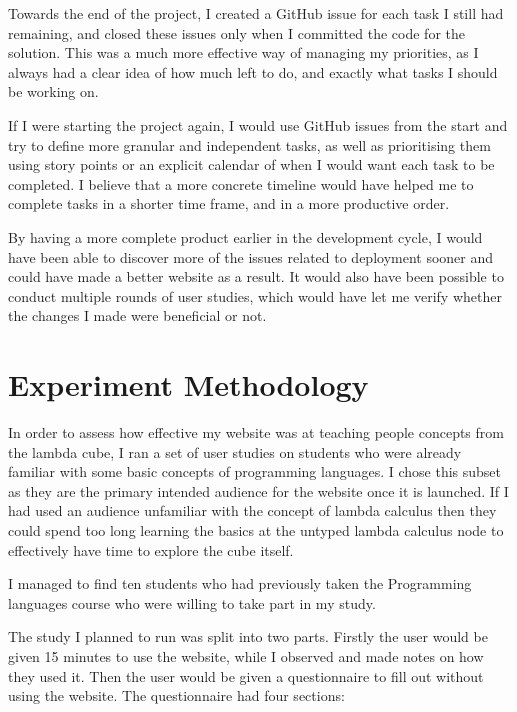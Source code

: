 \documentclass{l4proj}
\begin{document}
Towards the end of the project, I created a GitHub issue for each task I still had remaining, and closed these issues only when I committed the code for the solution.  This was a much more effective way of managing my priorities, as I always had a clear idea of how much left to do, and exactly what tasks I should be working on.

If I were starting the project again, I would use GitHub issues from the start and try to define more granular and independent tasks, as well as prioritising them using story points or an explicit calendar of when I would want each task to be completed.  I believe that a more concrete timeline would have helped me to complete tasks in a shorter time frame, and in a more productive order.

By having a more complete product earlier in the development cycle, I would have been able to discover more of the issues related to deployment sooner and could have made a better website as a result.  It would also have been possible to conduct multiple rounds of user studies, which would have let me verify whether the changes I made were beneficial or not.

\section{Experiment Methodology}

In order to assess how effective my website was at teaching people concepts from the lambda cube, I ran a set of user studies on students who were already familiar with some basic concepts of programming languages.  I chose this subset as they are the primary intended audience for the website once it is launched.  If I had used an audience unfamiliar with the concept of lambda calculus then they could spend too long learning the basics at the untyped lambda calculus node to effectively have time to explore the cube itself.

I managed to find ten students who had previously taken the Programming languages course who were willing to take part in my study.

The study I planned to run was split into two parts.  Firstly the user would be given 15 minutes to use the website, while I observed and made notes on how they used it.  Then the user would be given a questionnaire to fill out without using the website.  The questionnaire had four sections:
\end{document}

